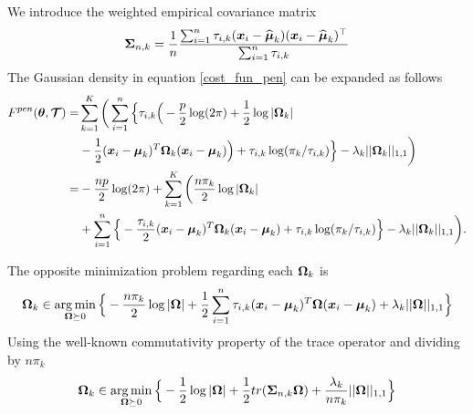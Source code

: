 We introduce the weighted empirical covariance matrix
\begin{equation}
\boldsymbol\Sigma_{n,k} = \frac{1}{n}\frac{\sum_{i=1}^n\tau_{i,k}(\boldsymbol x_i-\widehat{\boldsymbol\mu}_k)(\boldsymbol x_i-\widehat{\boldsymbol\mu}_k)^\top}{\sum_{i=1}^n\tau_{i,k}}
\end{equation}
The Gaussian density in equation \eqref{cost_fun_pen} can be expanded as follows
\begin{align*}
\label{cost_fun_pen_2}
F^{pen}({\boldsymbol\theta},\boldsymbol{\mathcal T})  =& \sum_{k=1}^K \bigg( \sum_{i=1}^{n}\Big\{ \tau_{i,k} \Big(
-\frac{p}{2}\log(2\pi)+\frac{1}{2}\log|\boldsymbol\Omega_k|\\
&-\frac{1}{2}(\boldsymbol x_i-\boldsymbol\mu_k)^T\boldsymbol\Omega_k(\boldsymbol x_i-\boldsymbol\mu_k) \Big)+\tau_{i,k} \log(\pi_k/\tau_{i,k})\Big\} -\lambda_k||\boldsymbol\Omega_k||_{1,1}\bigg)\\
=& -\frac{np}{2}\log(2\pi)+\sum_{k=1}^K \bigg(\frac{n\pi_k}{2}\log|\boldsymbol\Omega_k|\\
&+\sum_{i=1}^{n}\Big\{ -\frac{\tau_{i,k}}{2}(\boldsymbol x_i-\boldsymbol\mu_k)^T\boldsymbol\Omega_k(\boldsymbol x_i-\boldsymbol\mu_k)+\tau_{i,k} \log(\pi_k/\tau_{i,k})\Big\} -\lambda_k||\boldsymbol\Omega_k||_{1,1}\bigg). 
\end{align*}

The opposite minimization problem regarding each $\boldsymbol\Omega_k$ is
\begin{equation}
\boldsymbol\Omega_k \in \operatorname*{arg\,min}_{ \boldsymbol\Omega\succeq 0}\Big\{-\frac{n\pi_k}{2}\log|\boldsymbol\Omega|+\frac{1}{2}\sum_{i=1}^{n}\tau_{i,k}(\boldsymbol x_i-\boldsymbol\mu_k)^T\boldsymbol\Omega(\boldsymbol x_i-\boldsymbol\mu_k)+\lambda_k||\boldsymbol\Omega||_{1,1}\Big\}
\end{equation}
Using the well-known commutativity property of the trace operator and dividing by $n\pi_k$
\begin{equation}
\boldsymbol\Omega_k \in \operatorname*{arg\,min}_{ \boldsymbol\Omega\succeq 0} \Big\{ -\frac{1}{2}\log|\boldsymbol\Omega| +\frac{1}{2} tr(\boldsymbol\Sigma_{n,k}\boldsymbol\Omega)+\frac{\lambda_k}{n\pi_k}||\boldsymbol\Omega||_{1,1}\Big\}
\end{equation}

